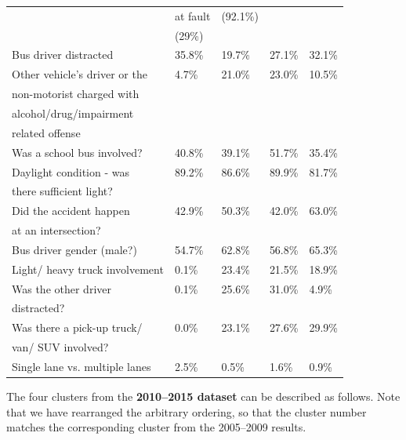 \begin{table}[t]
{\begin{tabular}{@{}lllll@{}}
                                  &  at fault                               & (92.1\%)            &                    &  \\
                                  &  (29\%)                              &                &                              & \\ \midrule
Bus driver distracted             & 35.8\%                  & 19.7\%     & 27.1\%           & 32.1\%  \\ \midrule
Other vehicle's driver or the     & {\color[HTML]{9A0000} 4.7\%}    & 21.0\%   & 23.0\%     & 10.5\% \\
non-motorist charged with         & & & & \\
alcohol/drug/impairment           & & & & \\
related offense                   & & & & \\ \midrule
Was a school bus involved?        &40.8\%  & 39.1\% & {\color[HTML]{9A0000} 51.7\%} & 35.4\%  \\ \midrule
Daylight condition - was          & 89.2\% & 86.6\% & 89.9\% & 81.7\%  \\
there sufficient light?           & & & & \\ \midrule
Did the accident happen           & 42.9\% & 50.3\% & 42.0\% & {\color[HTML]{9A0000} 63.0\%}  \\
at an intersection?               & & & & \\ \midrule
Bus driver gender (male?)         & 54.7\% & 62.8\% & 56.8\% & 65.3\%  \\ \midrule
Light/ heavy truck involvement    & 0.1\% &23.4\% & 21.5\% & 18.9\%  \\ \midrule
Was the other driver             & 0.1\% & 25.6\% & 31.0\% & {\color[HTML]{9A0000} 4.9\%}  \\
distracted?          & & & & \\ \midrule
Was there a pick-up truck/        & 0.0\% & 23.1\% & 27.6\% & 29.9\%  \\
van/ SUV involved?                & & & & \\ \midrule
Single lane vs. multiple lanes    &  2.5\% & 0.5\% & 1.6\% & 0.9\% \\ \bottomrule
        \end{tabular}
        }
\end{table}

The four clusters from the \textbf{2010--2015 dataset} can be
described as follows. Note that we have rearranged the arbitrary
ordering, so that the cluster number matches the corresponding cluster
from the 2005--2009 results. 

